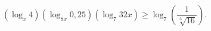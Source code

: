 \begin{ex}[type=inequality]
	\begin{condition}
		$(\log_x 4)(\log_{8x} 0,25)(\log_7 32x)\geqslant\log_7\left(\dfrac{1}{\sqrt[3]{16}}\right).$
	\end{condition}
	\answer{ $ x \in\left(0;2^{-\sqrt{15}}\right]\cup\left(\dfrac{1}{8};1\right)\cup\left[2^{\sqrt{15}};+\infty\right).$}
\end{ex}